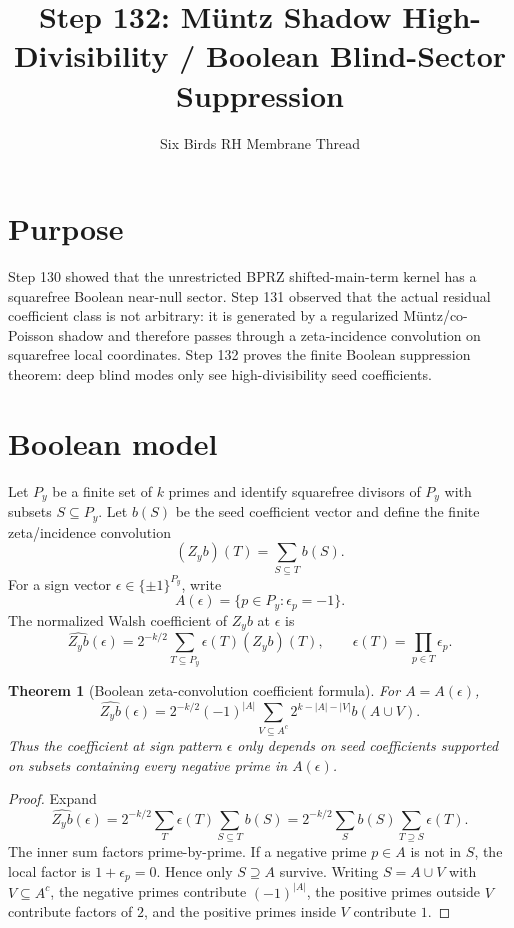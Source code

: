 \documentclass[11pt]{article}
\title{Step 132: M\"untz Shadow High-Divisibility / Boolean Blind-Sector Suppression}
\author{Six Birds RH Membrane Thread}
\date{}
\newtheorem{theorem}{Theorem}
\begin{document}
\maketitle

\section{Purpose}
Step 130 showed that the unrestricted BPRZ shifted-main-term kernel has a squarefree Boolean near-null sector. Step 131 observed that the actual residual coefficient class is not arbitrary: it is generated by a regularized M\"untz/co-Poisson shadow and therefore passes through a zeta-incidence convolution on squarefree local coordinates. Step 132 proves the finite Boolean suppression theorem: deep blind modes only see high-divisibility seed coefficients.

\section{Boolean model}
Let $P_y$ be a finite set of $k$ primes and identify squarefree divisors of $P_y$ with subsets $S\subseteq P_y$. Let $b(S)$ be the seed coefficient vector and define the finite zeta/incidence convolution
\[
  (Z_y b)(T)=\sum_{S\subseteq T} b(S).
\]
For a sign vector $\epsilon\in\{\pm1\}^{P_y}$, write
\[
  A(\epsilon)=\{p\in P_y:\epsilon_p=-1\}.
\]
The normalized Walsh coefficient of $Z_yb$ at $\epsilon$ is
\[
  \widehat{Z_yb}(\epsilon)=2^{-k/2}\sum_{T\subseteq P_y}\epsilon(T)(Z_yb)(T),
  \qquad \epsilon(T)=\prod_{p\in T}\epsilon_p.
\]

\begin{theorem}[Boolean zeta-convolution coefficient formula]
For $A=A(\epsilon)$,
\[
\boxed{
  \widehat{Z_yb}(\epsilon)=
  2^{-k/2}(-1)^{|A|}
  \sum_{V\subseteq A^c}2^{k-|A|-|V|}b(A\cup V).
}
\]
Thus the coefficient at sign pattern $\epsilon$ only depends on seed coefficients supported on subsets containing every negative prime in $A(\epsilon)$.
\end{theorem}

\begin{proof}
Expand
\[
\widehat{Z_yb}(\epsilon)=2^{-k/2}\sum_T\epsilon(T)\sum_{S\subseteq T}b(S)
=2^{-k/2}\sum_S b(S)\sum_{T\supseteq S}\epsilon(T).
\]
The inner sum factors prime-by-prime. If a negative prime $p\in A$ is not in $S$, the local factor is $1+\epsilon_p=0$. Hence only $S\supseteq A$ survive. Writing $S=A\cup V$ with $V\subseteq A^c$, the negative primes contribute $(-1)^{|A|}$, the positive primes outside $V$ contribute factors of $2$, and the positive primes inside $V$ contribute $1$.
\end{proof}
\end{document}
